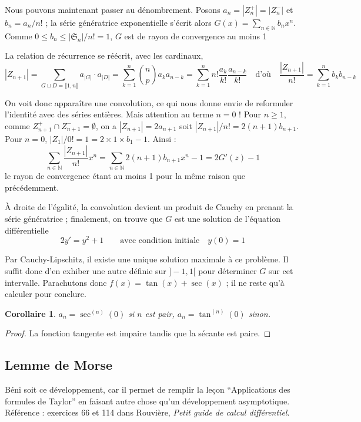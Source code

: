\documentclass[a4paper, 11pt]{article}
\def\N{\mathbb{N}}
\def\Sigmap{\mathfrak{S}}
\newtheorem*{corollary}{Corollaire}
\begin{document}
Nous pouvons maintenant passer au dénombrement. Posons $a_n = |Z_n^+| = |Z_n^-|$
et $b_n = a_n/n!$ ; la série génératrice exponentielle s'écrit alors $G(x) =
\sum_{n \in \N} b_n x^n$. Comme $0 \leq b_n \leq |\Sigmap_n| / n! = 1$, $G$ est
de rayon de convergence au moins 1

La relation de récurrence se réécrit, avec les cardinaux,
\[ |Z_{n+1}| = \sum_{G \sqcup D = \llbracket 1,n \rrbracket} a_{|G|} \cdot
  a_{|D|} = \sum_{k = 1}^n \binom{n}{p} a_k a_{n-k}
  = \sum_{k = 1}^n n! \frac{a_k}{k!} \frac{a_{n-k}}{k!} \quad \text{d'où} \quad
  \frac{|Z_{n+1}|}{n!} = \sum_{k = 1}^n b_k b_{n-k}
\]

On voit donc apparaître une convolution, ce qui nous donne envie de reformuler
l'identité avec des séries entières. Mais attention au terme $n = 0$ ! Pour $n
\geq 1$, comme $Z_{n+1}^+ \cap Z_{n+1}^- = \emptyset$, on a $|Z_{n+1}| =
2a_{n+1}$ soit $|Z_{n+1}|/n! = 2(n+1)b_{n+1}$. Pour $n = 0$, $|Z_1|/0! = 1 =
2 \times 1 \times b_1 - 1$. Ainsi :
\[ \sum_{n \in \N} \frac{|Z_{n+1}|}{n!}x^n = \sum_{n \in \N} 2(n+1)b_{n+1}x^n - 1
  = 2G'(z) - 1
\]
le rayon de convergence étant au moins 1 pour la même raison que précédemment.

À droite de l'égalité, la convolution devient un produit de Cauchy en prenant la
série génératrice ; finalement, on trouve que $G$ est une solution de l'équation
différentielle
\[ 2y' = y^2 + 1 \qquad \text{avec condition initiale} \quad y(0) = 1 \]

Par Cauchy-Lipschitz, il existe une unique solution maximale à ce problème. Il
suffit donc d'en exhiber une autre définie sur $]-1,1[$ pour déterminer $G$ sur
cet intervalle. Parachutons donc $f(x) = \tan(x) + \sec(x)$ ; il ne reste qu'à
calculer pour conclure.


\begin{corollary}
  $a_n = \sec^{(n)}(0)$ si $n$ est pair, $a_n = \tan^{(n)}(0)$ sinon.
\end{corollary}
\begin{proof}
  La fonction tangente est impaire tandis que la sécante est paire.
\end{proof}

\newpage

\subsection{Lemme de Morse}

Béni soit ce développement, car il permet de remplir la leçon
\enquote{Applications des formules de Taylor} en faisant autre chose qu'un
développement asymptotique. Référence : exercices 66 et 114 dans Rouvière,
\emph{Petit guide de calcul différentiel}.
\end{document}
